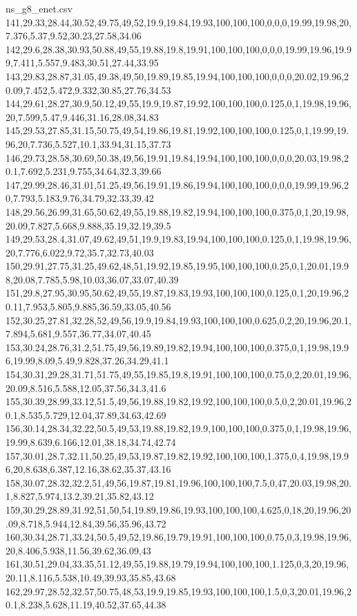 \begin{filecontents*}[overwrite]{ns_g8_enet.csv}
141,29.33,28.44,30.52,49.75,49,52,19.9,19.84,19.93,100,100,100,0,0,0,19.99,19.98,20,7.376,5.37,9.52,30.23,27.58,34.06
142,29.6,28.38,30.93,50.88,49,55,19.88,19.8,19.91,100,100,100,0,0,0,19.99,19.96,19.99,7.411,5.557,9.483,30.51,27.44,33.95
143,29.83,28.87,31.05,49.38,49,50,19.89,19.85,19.94,100,100,100,0,0,0,20.02,19.96,20.09,7.452,5.472,9.332,30.85,27.76,34.53
144,29.61,28.27,30.9,50.12,49,55,19.9,19.87,19.92,100,100,100,0.125,0,1,19.98,19.96,20,7.599,5.47,9.446,31.16,28.08,34.83
145,29.53,27.85,31.15,50.75,49,54,19.86,19.81,19.92,100,100,100,0.125,0,1,19.99,19.96,20,7.736,5.527,10.1,33.94,31.15,37.73
146,29.73,28.58,30.69,50.38,49,56,19.91,19.84,19.94,100,100,100,0,0,0,20.03,19.98,20.1,7.692,5.231,9.755,34.64,32.3,39.66
147,29.99,28.46,31.01,51.25,49,56,19.91,19.86,19.94,100,100,100,0,0,0,19.99,19.96,20,7.793,5.183,9.76,34.79,32.33,39.42
148,29.56,26.99,31.65,50.62,49,55,19.88,19.82,19.94,100,100,100,0.375,0,1,20,19.98,20.09,7.827,5.668,9.888,35.19,32.19,39.5
149,29.53,28.4,31.07,49.62,49,51,19.9,19.83,19.94,100,100,100,0.125,0,1,19.98,19.96,20,7.776,6.022,9.72,35.7,32.73,40.03
150,29.91,27.75,31.25,49.62,48,51,19.92,19.85,19.95,100,100,100,0.25,0,1,20.01,19.98,20.08,7.785,5.98,10.03,36.07,33.07,40.39
151,29.8,27.95,30.95,50.62,49,55,19.87,19.83,19.93,100,100,100,0.125,0,1,20,19.96,20.11,7.953,5.805,9.885,36.59,33.05,40.56
152,30.25,27.81,32.28,52,49,56,19.9,19.84,19.93,100,100,100,0.625,0,2,20,19.96,20.1,7.894,5.681,9.557,36.77,34.07,40.45
153,30.24,28.76,31.2,51.75,49,56,19.89,19.82,19.94,100,100,100,0.375,0,1,19.98,19.96,19.99,8.09,5.49,9.828,37.26,34.29,41.1
154,30.31,29.28,31.71,51.75,49,55,19.85,19.8,19.91,100,100,100,0.75,0,2,20.01,19.96,20.09,8.516,5.588,12.05,37.56,34.3,41.6
155,30.39,28.99,33.12,51.5,49,56,19.88,19.82,19.92,100,100,100,0.5,0,2,20.01,19.96,20.1,8.535,5.729,12.04,37.89,34.63,42.69
156,30.14,28.34,32.22,50.5,49,53,19.88,19.82,19.9,100,100,100,0.375,0,1,19.98,19.96,19.99,8.639,6.166,12.01,38.18,34.74,42.74
157,30.01,28.7,32.11,50.25,49,53,19.87,19.82,19.92,100,100,100,1.375,0,4,19.98,19.96,20,8.638,6.387,12.16,38.62,35.37,43.16
158,30.07,28.32,32.2,51,49,56,19.87,19.81,19.96,100,100,100,7.5,0,47,20.03,19.98,20.1,8.827,5.974,13.2,39.21,35.82,43.12
159,30.29,28.89,31.92,51,50,54,19.89,19.86,19.93,100,100,100,4.625,0,18,20,19.96,20.09,8.718,5.944,12.84,39.56,35.96,43.72
160,30.34,28.71,33.24,50.5,49,52,19.86,19.79,19.91,100,100,100,0.75,0,3,19.98,19.96,20,8.406,5.938,11.56,39.62,36.09,43
161,30.51,29.04,33.35,51.12,49,55,19.88,19.79,19.94,100,100,100,1.125,0,3,20,19.96,20.11,8.116,5.538,10.49,39.93,35.85,43.68
162,29.97,28.52,32.57,50.75,48,53,19.9,19.85,19.93,100,100,100,1.5,0,3,20.01,19.96,20.1,8.238,5.628,11.19,40.52,37.65,44.38

\end{filecontents*}
